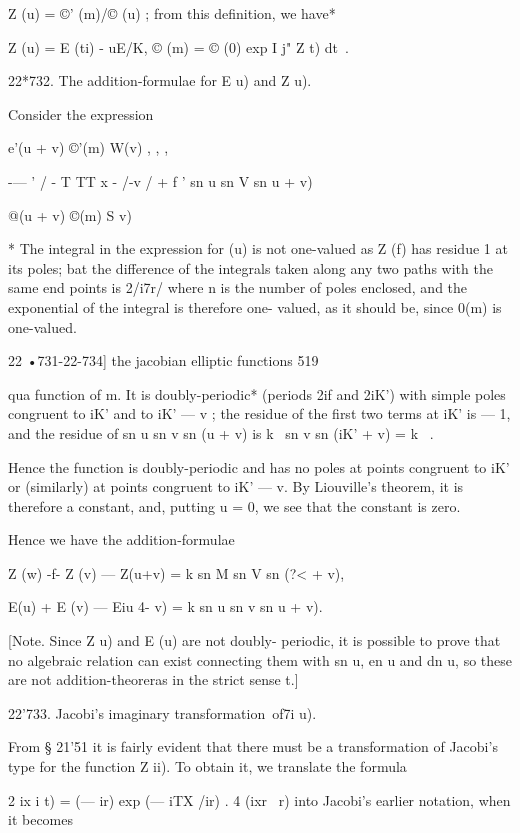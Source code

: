 Z (u) = ©' (m)/© (u) ; 
from this definition, we have* 

Z (u) = E (ti) - uE/K, © (m) = © (0) exp I j" Z  t) dt\ . 

22*732. The addition-formulae for E  u) and Z u). 

Consider the expression 

e'(u + v) ©'(m) W(v) ,  , , 

-— ' / - T TT x - /-v /  + f ' sn u sn V sn  u + v) 

@(u + v) ©(m) S v) 

* The integral in the expression for (u) is not one-valued as Z (f) has residue 1 at its poles; 
bat the difference of the integrals taken along any two paths with the same end points is 2/i7r/ 
where n is the number of poles enclosed, and the exponential of the integral is therefore one- 
valued, as it should be, since 0(m) is one-valued. 



22 •731-22-734] the jacobian elliptic functions 519 

qua function of m. It is doubly-periodic* (periods 2if and 2iK') with simple 
poles congruent to iK' and to iK' — v ; the residue of the first two terms at 
iK' is — 1, and the residue of sn u sn v sn (u + v) is k~  sn v sn (iK' + v) = k~ . 

Hence the function is doubly-periodic and has no poles at points 
congruent to iK' or (similarly) at points congruent to iK' — v. By 
Liouville's theorem, it is therefore a constant, and, putting u = 0, we see 
that the constant is zero. 

Hence we have the addition-formulae 

Z (w) -f- Z (v) — Z(u+v) = k  sn M sn V sn (?< + v), 

E(u) + E (v) — Eiu 4- v) = k  sn u sn v sn u + v). 

[Note. Since Z u) and E (u) are not doubly- periodic, it is possible to prove that no 
algebraic relation can exist connecting them with sn u, en u and dn u, so these are not 
addition-theoreras in the strict sense t.] 

22'733. Jacobi's imaginary transformation\ of7i u). 

From § 21'51 it is fairly evident that there must be a transformation of 
Jacobi's type for the function Z  ii). To obtain it, we translate the formula 

 2  ix i t) = (— ir)  exp (— iTX /ir) .  4 (ixr \ r) 
into Jacobi's earlier notation, when it becomes 



